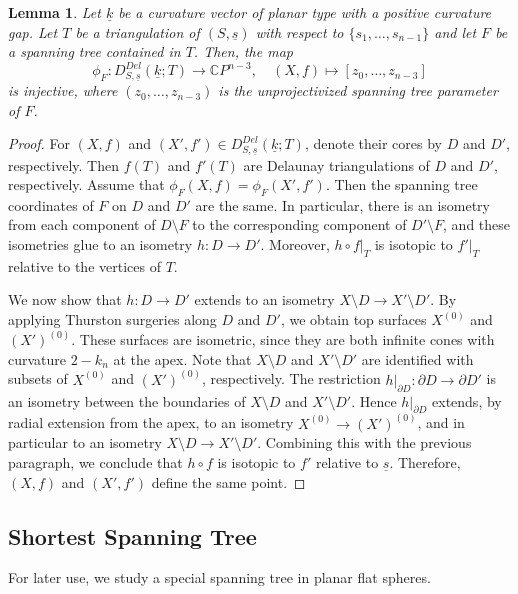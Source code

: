 \documentclass{compositio}
\numberwithin{equation}{section}
\numberwithin{figure}{section}
\theoremstyle{definition}
\theoremstyle{plain}
\newtheorem{lemma}[definition]{Lemma}
\begin{document}
{\begin{lemma}\label{lem:spanningtreeinfinitecase}
    Let $\underline{k}$ be a curvature vector of planar type with a positive curvature gap. Let $T$ be a triangulation of $(S,\underline{s})$ with respect to $\{s_1,\ldots,s_{n-1}\}$ and let $F$ be a spanning tree contained in $T$. Then, the map
    $$
    \phi_F: D_{S,\underline{s}}^{Del}(\underline{k};T) \to \mathbb{C}P^{n-3}, \quad (X, f) \mapsto [z_0, \ldots, z_{n-3}]
    $$
    is injective, where $(z_0, \ldots, z_{n-3})$ is the unprojectivized spanning tree parameter of $F$.
\end{lemma}

\begin{proof}
For $(X,f)$ and $(X',f') \in D_{S,\underline{s}}^{Del}(\underline{k};T)$, denote their cores by $D$ and $D'$, respectively. Then $f(T)$ and $f'(T)$ are Delaunay triangulations of $D$ and $D'$, respectively. Assume that
$\phi_F(X,f) = \phi_F(X',f')$. Then the spanning tree coordinates of $F$ on $D$ and $D'$ are the same. In particular, there is an isometry from each component of $D\setminus F$ to the corresponding component of $D'\setminus F$, and these isometries glue to an isometry $h:D\to D'$. Moreover, $h\circ f|_T$ is isotopic to $f'|_T$ relative to the vertices of $T$.
 
We now show that $h:D\to D'$ extends to an isometry
$X\setminus D \to X'\setminus D'$. By applying Thurston surgeries along $D$ and $D'$, we obtain top surfaces $X^{(0)}$ and $(X')^{(0)}$. These surfaces are isometric, since they are both infinite cones with curvature $2-k_n$ at the apex. Note that $X\setminus D$ and $X'\setminus D'$ are identified with subsets of $X^{(0)}$ and $(X')^{(0)}$, respectively. The restriction
$h|_{\partial D}:\partial D\to \partial D'$
is an isometry between the boundaries of $X\setminus D$ and $X'\setminus D'$. Hence $h|_{\partial D}$ extends, by radial extension from the apex, to an isometry
$X^{(0)}\to (X')^{(0)}$, and in particular to an isometry
$X\setminus D \to X'\setminus D'$.
Combining this with the previous paragraph, we conclude that $h\circ f$ is isotopic to $f'$ relative to $\underline{s}$. Therefore, $(X,f)$ and $(X',f')$ define the same point.
\end{proof}

\subsection{Shortest Spanning Tree}
For later use, we study a special spanning tree in planar flat spheres.

}
\end{document}
